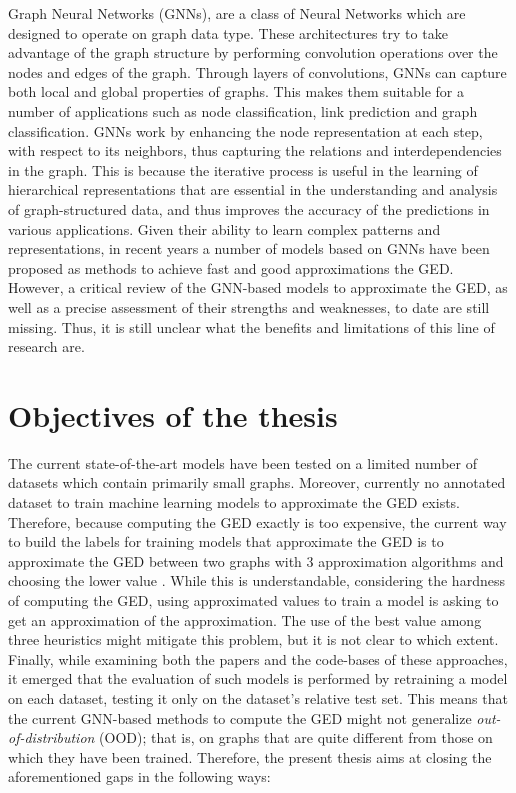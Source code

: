 \documentclass[../Thesis.tex]{subfiles}
\begin{document}
	Graph Neural Networks (GNNs), are a class of Neural Networks which are designed to operate on graph data type. These architectures try to take advantage of the graph structure by performing convolution operations over the nodes and edges of the graph. Through layers of convolutions, GNNs can capture both local and global properties of graphs. This makes them suitable for a number of applications such as node classification, link prediction and graph classification. GNNs work by enhancing the node representation at each step, with respect to its neighbors, thus capturing the relations and interdependencies in the graph. This is because the iterative process is useful in the learning of hierarchical representations that are essential in the understanding and analysis of graph-structured data, and thus improves the accuracy of the predictions in various applications. Given their ability to learn complex patterns and representations, in recent years a number of models based on GNNs have been proposed as methods to achieve fast and good approximations the GED. However, a critical review of the GNN-based models to approximate the GED, as well as a precise assessment of their strengths and weaknesses, to date are still missing. Thus, it is still unclear what the benefits and limitations of this line of research are.

\section{Objectives of the thesis}
 	 The current state-of-the-art models have been tested on a limited number of datasets which contain primarily small graphs. Moreover, currently no annotated dataset to train machine learning models to approximate the GED exists. Therefore, because computing the GED exactly is too expensive, the current way to build the labels for training models that approximate the GED is to approximate the GED between two graphs with 3 approximation algorithms and choosing the lower value \cite{simgnn__a_neural_network_approach_to_fast_graph_similarity_computation, computing_graph_edit_distance_via_neural_graph_matching}. While this is understandable, considering the hardness of computing the GED, using approximated values to train a model is asking to get an approximation of the approximation. The use of the best value among three heuristics might mitigate this problem, but it is not clear to which extent. Finally, while examining both the papers and the code-bases of these approaches, it emerged that the evaluation of such models is performed by retraining a model on each dataset, testing it only on the dataset's relative test set. This means that the current GNN-based methods to compute the GED might not generalize \emph{out-of-distribution} (OOD); that is, on graphs that are quite different from those on which they have been trained. Therefore, the present thesis aims at closing the aforementioned gaps in the following ways:
\end{document}
